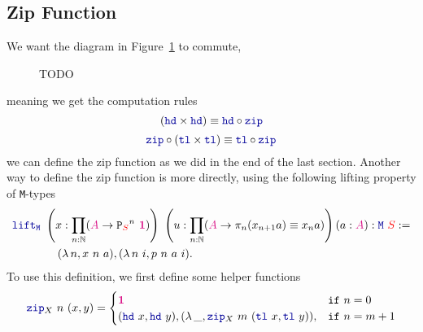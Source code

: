 \documentclass[twoside,11pt,openright]{report}
\theoremstyle{plain} %
\theoremstyle{definition}
\theoremstyle{remark}
\newcommand*{\figref}[1]{Figure~\ref{fig:#1}}
\newcommand*{\type}[1]{\textcolor{magenta!90!black}{#1}}
\newcommand*{\container}[1]{\textcolor{red}{#1}}
\newcommand*{\unit}{\type{\textbf{1}}}
\newcommand*{\function}[1]{\textcolor{blue!60!black}{\ensuremath{\mathtt{#1}}}}
\newcommand*{\typeformer}[1]{\ensuremath{\mathtt{#1}}}
\newcommand*{\functor}[1]{\ensuremath{\mathbf{\mathtt{#1}}}}
\begin{document}
\subsection{Zip Function}
We want the diagram in \figref{zip-computation-rules} to commute,
\begin{figure}[h]
  \centering
  \caption{TODO}
  \label{fig:zip-computation-rules}
\end{figure}
meaning we get the computation rules
\begin{equation}
  (\function{hd} \times \function{hd}) \equiv \function{hd} \circ \function{zip}
\end{equation}
\begin{equation}
  \function{zip} \circ (\function{tl} \times \function{tl}) \equiv \function{tl} \circ \function{zip}
\end{equation}
we can define the zip function as we did in the end of the last section. Another way to define the zip function is more directly, using the following lifting property of \texttt{M}-types
\begin{equation}
  \begin{aligned}
    &\function{lift_M}~\left(x : \prod_{n : \mathbb{N}} (\type{A} \rightarrow {\functor{P}_{\container{S}}}^n~\unit)\right)~\left(u : \prod_{n : \mathbb{N}} (\type{A} \rightarrow \pi_n (x_{n+1} a) \equiv x_n a)\right) (a : \type{A}) : \function{M}~\container{S} := \\
    &\qquad\qquad (\lambda\,n, x~n~a) , (\lambda\,n~i, p~n~a~i).
  \end{aligned} \label{eq:M-lift}
\end{equation}
To use this definition, we first define some helper functions
\begin{equation}
  \function{zip}_{X}~n~(x , y) = \begin{cases} \unit & \mathtt{if}~n = 0 \\ (\function{hd}~x , \function{hd}~y) , (\lambda\,\_, \function{zip}_{X}~m~(\function{tl}~x,\function{tl}~y)) , & \mathtt{if}~n = m + 1 \end{cases}
\end{equation}
\end{document}
